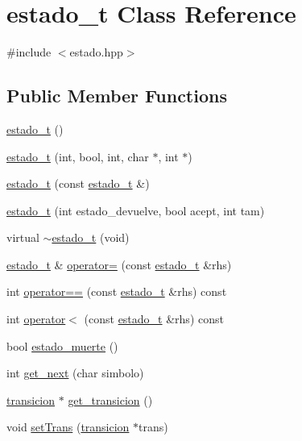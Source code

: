 \hypertarget{classestado__t}{\section{estado\-\_\-t Class Reference}
\label{classestado__t}
}


{\ttfamily \#include $<$estado.\-hpp$>$}

\subsection*{Public Member Functions}
\begin{DoxyCompactItemize}
\item 
\hyperlink{classestado__t_a8e45cb6ecaf97bb8e9a33f82151f9323}{estado\-\_\-t} ()
\item 
\hyperlink{classestado__t_ae6fd334fd74a870dff61d310924e0424}{estado\-\_\-t} (int, bool, int, char $\ast$, int $\ast$)
\item 
\hyperlink{classestado__t_ac3dd69d9374264ee0a54868e60773473}{estado\-\_\-t} (const \hyperlink{classestado__t}{estado\-\_\-t} \&)
\item 
\hyperlink{classestado__t_afb5a0d229dfbcadc5ccc4a0ee8d02f3c}{estado\-\_\-t} (int estado\-\_\-devuelve, bool acept, int tam)
\item 
virtual \hyperlink{classestado__t_ab8d1d9470fbf8083b8107ff6c70be4d7}{$\sim$estado\-\_\-t} (void)
\item 
\hyperlink{classestado__t}{estado\-\_\-t} \& \hyperlink{classestado__t_ad7a36a03430853701e4591e05187a14e}{operator=} (const \hyperlink{classestado__t}{estado\-\_\-t} \&rhs)
\item 
int \hyperlink{classestado__t_aed35e32cb89561ac0e3f3f0b71cc22a0}{operator==} (const \hyperlink{classestado__t}{estado\-\_\-t} \&rhs) const 
\item 
int \hyperlink{classestado__t_a54fceb2e5e0b3da90999f6baed168bbb}{operator$<$} (const \hyperlink{classestado__t}{estado\-\_\-t} \&rhs) const 
\item 
bool \hyperlink{classestado__t_a7d6d9f2a6b73019a1d6293b2821a21cd}{estado\-\_\-muerte} ()
\item 
int \hyperlink{classestado__t_a0599ddc0084caf5b9c454dcbc2098cb9}{get\-\_\-next} (char simbolo)
\item 
\hyperlink{structtransicion}{transicion} $\ast$ \hyperlink{classestado__t_acc668d2ecfcc37002042f8ee6099c034}{get\-\_\-transicion} ()
\item 
void \hyperlink{classestado__t_a3e1a732c3eeb1d678e70bbefd3243a39}{set\-Trans} (\hyperlink{structtransicion}{transicion} $\ast$trans)
\end{DoxyCompactItemize}
